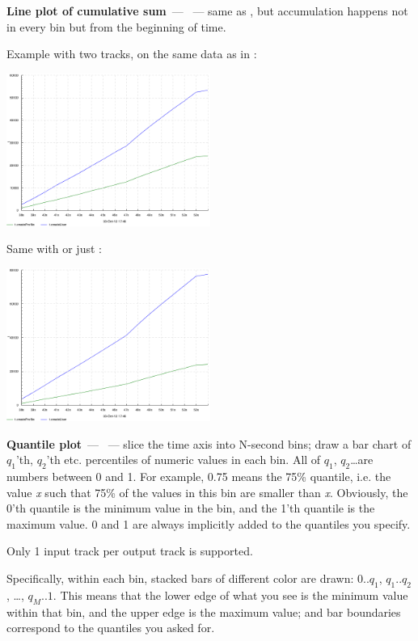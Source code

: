 \documentclass{article}
\begin{document}
\pagebreak
\noindent
\textbf{Line plot of cumulative sum}~--- ~--- same as , but accumulation happens not in every bin but from the beginning of time.

Example with two tracks, on the same data as in : 

\centerline{\includegraphics[width=0.5\textwidth]{pics/tplot/cumsum-create-user-and-profile-overlayed.png}}

Same with  or just :

\centerline{\includegraphics[width=0.5\textwidth]{pics/tplot/cumsum-create-user-and-profile-stacked.png}}

\pagebreak
\noindent
\textbf{Quantile plot}~--- ~--- slice the time axis into N-second bins; draw a bar chart of $q_1$'th, $q_2$'th etc. percentiles of numeric values in each bin. All of $q_1$, $q_2$\ldots are numbers between 0 and 1. For example, 0.75 means the 75\% quantile, i.e. the value \emph{x} such that 75\% of the values in this bin are smaller than \emph{x}. Obviously, the 0'th quantile is the minimum value in the bin, and the 1'th quantile is the maximum value. 0 and 1 are always implicitly added to the quantiles you specify.

Only 1 input track per output track is supported.

Specifically, within each bin, stacked bars of different color are drawn: $0..q_1$, $q_1..q_2$, \ldots, $q_M..1$. This means that the lower edge of what you see is the minimum value within that bin, and the upper edge is the maximum value; and bar boundaries correspond to the quantiles you asked for.
\end{document}
